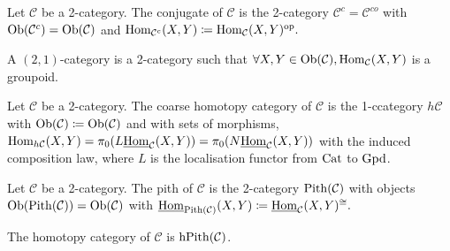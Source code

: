 \begin{defi}
	Let $\mathcal{ C }$ be a 2-category. The conjugate of $\mathcal{ C } $ is the 2-category $ \mathcal{C}^c = \mathcal{ C }^{co} $ with $\operatorname{Ob}( \mathcal{ C }^c ) = \operatorname{Ob} ( \mathcal{ C } )$ and $ \operatorname{Hom}_{ \mathcal{ C }^c} ( X , Y ) \coloneqq \operatorname{Hom}_{ \mathcal{ C } } ( X , Y )^{ \operatorname{op}}.$
\end{defi}

\begin{defi}
	A $ ( 2 ,1 )$-category is a 2-category such that $ \forall X, Y \in \operatorname{Ob} ( \mathcal{ C } ), \operatorname{Hom}_{ \mathcal{ C } } (X , Y) $ is a groupoid.
\end{defi}

\begin{defi}
	Let $ \mathcal{ C } $ be a 2-category. The coarse homotopy category of $\mathcal{C}$ is the 1-ccategory $h\mathcal{C}$ with $\operatorname{Ob} ( \mathcal{C } ) \coloneqq \operatorname{Ob}(\mathcal{ C } ) $ and with sets of morphisms, $ \operatorname{Hom}_{ h \mathcal{ C } }  ( X , Y ) = \pi_0 ( L \underline{ \operatorname{Hom} }_{ \mathcal{ C } } ( X , Y )) = \pi_0 ( N \underline{\operatorname{Hom}}_{\mathcal{ C } }( X , Y ))$ with the induced composition law, where $L$  is the localisation functor from $ \operatorname{Cat} $ to $\operatorname{Gpd}$.
\end{defi}

\begin{defi}
	Let $\mathcal{ C }$ be a 2-category.
	The pith of $ \mathcal{ C } $ is the 2-category $ \operatorname{Pith} ( \mathcal{ C } )$ with objects $ \operatorname{Ob} ( \operatorname{Pith} ( \mathcal{ C } ) )=\operatorname{Ob} ( \mathcal{ C } )$ with $\underline{ \operatorname{Hom} }_{ \operatorname{Pith} ( \mathcal{ C } ) } ( X, Y ) \coloneqq \underline{\operatorname{Hom}}_{ \mathcal{ C } } ( X , Y )^{ \cong }.$
\end{defi}

\begin{defi}
	The homotopy category of $ \mathcal{ C } $ is $ \operatorname{hPith} ( \mathcal{ C } ) $.
\end{defi}
